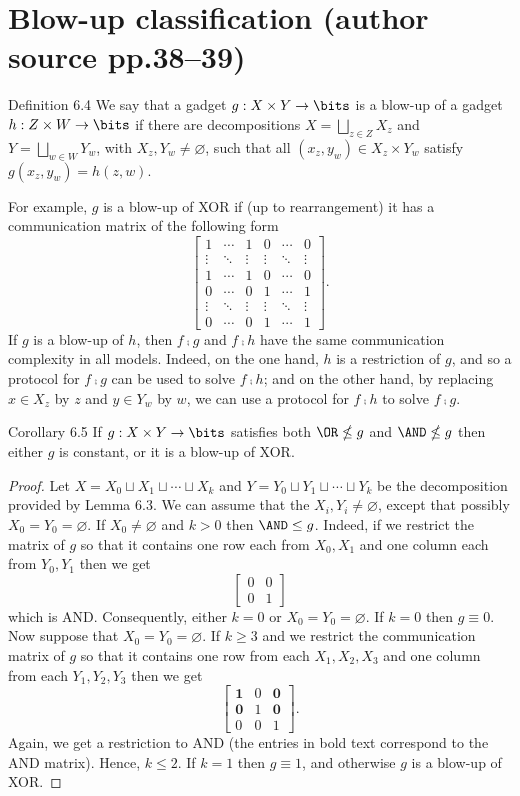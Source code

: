 \section*{Blow-up classification (author source pp.38--39)}
\begin{originalresult}{Definition 6.4}
We say that a gadget $g:X\times Y\to\bits$ is a blow-up of a gadget $h:Z\times W\to\bits$ if there are decompositions $X=\bigsqcup_{z\in Z}X_z$ and $Y=\bigsqcup_{w\in W}Y_w$, with $X_z,Y_w\ne\varnothing$, such that all $(x_z,y_w)\in X_z\times Y_w$ satisfy $g(x_z,y_w)=h(z,w)$.
\end{originalresult}
For example, $g$ is a blow-up of XOR if (up to rearrangement) it has a communication matrix of the following form
\[\begin{bmatrix}1&\cdots&1&0&\cdots&0\\\vdots&\ddots&\vdots&\vdots&\ddots&\vdots\\1&\cdots&1&0&\cdots&0\\0&\cdots&0&1&\cdots&1\\\vdots&\ddots&\vdots&\vdots&\ddots&\vdots\\0&\cdots&0&1&\cdots&1\end{bmatrix}.\]
If $g$ is a blow-up of $h$, then $f\comp g$ and $f\comp h$ have the same communication complexity in all models. Indeed, on the one hand, $h$ is a restriction of $g$, and so a protocol for $f\comp g$ can be used to solve $f\comp h$; and on the other hand, by replacing $x\in X_z$ by $z$ and $y\in Y_w$ by $w$, we can use a protocol for $f\comp h$ to solve $f\comp g$.
\begin{originalresult}{Corollary 6.5}
If $g:X\times Y\to\bits$ satisfies both $\OR\nleq g$ and $\AND\nleq g$ then either $g$ is constant, or it is a blow-up of XOR.
\end{originalresult}
\begin{proof}
Let $X=X_0\sqcup X_1\sqcup\cdots\sqcup X_k$ and $Y=Y_0\sqcup Y_1\sqcup\cdots\sqcup Y_k$ be the decomposition provided by Lemma 6.3. We can assume that the $X_i,Y_i\ne\varnothing$, except that possibly $X_0=Y_0=\varnothing$.
If $X_0\ne\varnothing$ and $k>0$ then $\AND\le g$. Indeed, if we restrict the matrix of $g$ so that it contains one row each from $X_0,X_1$ and one column each from $Y_0,Y_1$ then we get
\[\begin{bmatrix}0&0\\0&1\end{bmatrix}\]
which is AND. Consequently, either $k=0$ or $X_0=Y_0=\varnothing$.
If $k=0$ then $g\equiv0$. Now suppose that $X_0=Y_0=\varnothing$. If $k\ge3$ and we restrict the communication matrix of $g$ so that it contains one row from each $X_1,X_2,X_3$ and one column from each $Y_1,Y_2,Y_3$ then we get
\[\begin{bmatrix}\mathbf1&0&\mathbf0\\\mathbf0&1&\mathbf0\\0&0&1\end{bmatrix}.\]
Again, we get a restriction to AND (the entries in bold text correspond to the AND matrix). Hence, $k\le2$. If $k=1$ then $g\equiv1$, and otherwise $g$ is a blow-up of XOR.
\end{proof}
